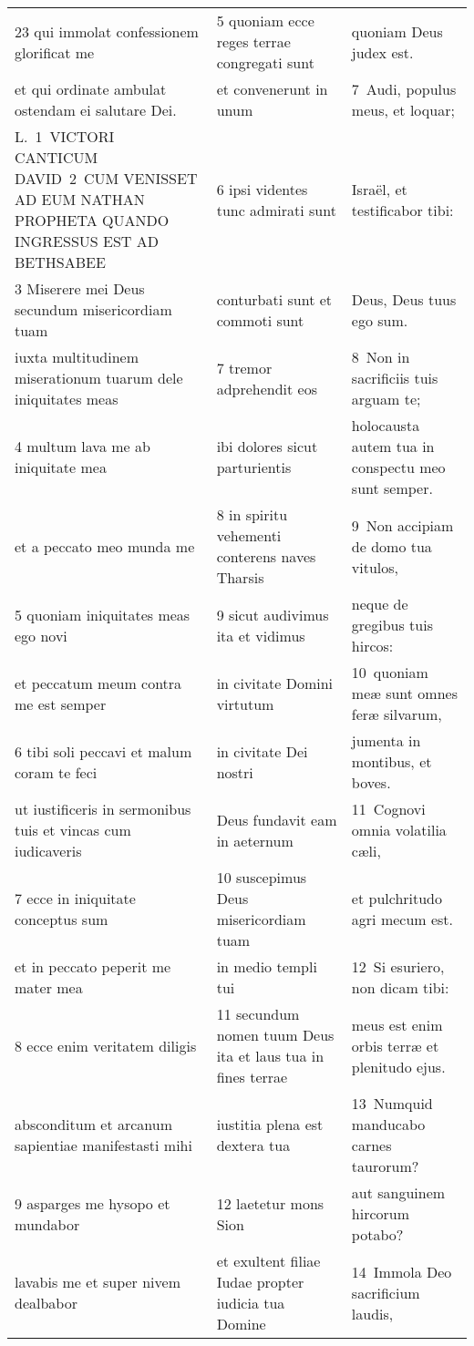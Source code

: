 \documentclass{article}
\begin{document}
\begin{longtable}{@{}p{}p{}p{}@{}}
23 qui immolat confessionem glorificat me	&	5 quoniam ecce reges terrae congregati sunt	&	quoniam Deus judex est.	\\
et qui ordinate ambulat ostendam ei salutare Dei.	&	et convenerunt in unum	&	7 Audi, populus meus, et loquar;	\\
L. 1 VICTORI CANTICUM DAVID 2 CUM VENISSET AD EUM NATHAN PROPHETA QUANDO INGRESSUS EST AD BETHSABEE	&	6 ipsi videntes tunc admirati sunt	&	Israël, et testificabor tibi:	\\
3 Miserere mei Deus secundum misericordiam tuam	&	conturbati sunt et commoti sunt	&	Deus, Deus tuus ego sum.	\\
iuxta multitudinem miserationum tuarum dele iniquitates meas	&	7 tremor adprehendit eos	&	8 Non in sacrificiis tuis arguam te;	\\
4 multum lava me ab iniquitate mea	&	ibi dolores sicut parturientis	&	holocausta autem tua in conspectu meo sunt semper.	\\
et a peccato meo munda me	&	8 in spiritu vehementi conterens naves Tharsis	&	9 Non accipiam de domo tua vitulos,	\\
5 quoniam iniquitates meas ego novi	&	9 sicut audivimus ita et vidimus	&	neque de gregibus tuis hircos:	\\
et peccatum meum contra me est semper	&	in civitate Domini virtutum	&	10 quoniam meæ sunt omnes feræ silvarum,	\\
6 tibi soli peccavi et malum coram te feci	&	in civitate Dei nostri	&	jumenta in montibus, et boves.	\\
ut iustificeris in sermonibus tuis et vincas cum iudicaveris	&	Deus fundavit eam in aeternum	&	11 Cognovi omnia volatilia cæli,	\\
7 ecce in iniquitate conceptus sum	&	10 suscepimus Deus misericordiam tuam	&	et pulchritudo agri mecum est.	\\
et in peccato peperit me mater mea	&	in medio templi tui	&	12 Si esuriero, non dicam tibi:	\\
8 ecce enim veritatem diligis	&	11 secundum nomen tuum Deus ita et laus tua in fines terrae	&	meus est enim orbis terræ et plenitudo ejus.	\\
absconditum et arcanum sapientiae manifestasti mihi	&	iustitia plena est dextera tua	&	13 Numquid manducabo carnes taurorum?	\\
9 asparges me hysopo et mundabor	&	12 laetetur mons Sion	&	aut sanguinem hircorum potabo?	\\
lavabis me et super nivem dealbabor	&	et exultent filiae Iudae propter iudicia tua Domine	&	14 Immola Deo sacrificium laudis,	\\

\end{longtable}
\end{document}
